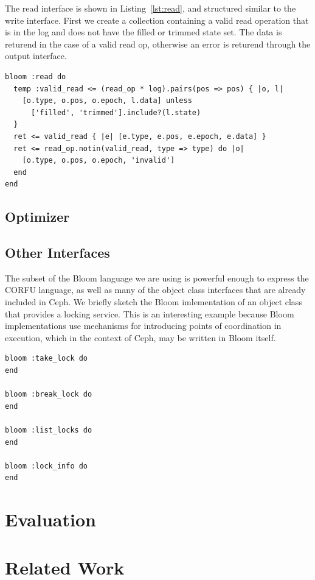 \documentclass[10pt,twocolumn]{article}
\begin{document}
The read interface is shown in Listing~\ref{lst:read}, and structured similar
to the write interface. First we create a collection containing a valid read
operation that is in the log and does not have the filled or trimmed state set.
The data is returend in the case of a valid read op, otherwise an error is
returend through the output interface.

\begin{lstlisting}[caption={Read}, label=lst:read]
bloom :read do
  temp :valid_read <= (read_op * log).pairs(pos => pos) { |o, l|
    [o.type, o.pos, o.epoch, l.data] unless
      ['filled', 'trimmed'].include?(l.state)
  }
  ret <= valid_read { |e| [e.type, e.pos, e.epoch, e.data] }
  ret <= read_op.notin(valid_read, type => type) do |o|
    [o.type, o.pos, o.epoch, 'invalid']
  end
end
\end{lstlisting}

\subsection{Optimizer}

\subsection{Other Interfaces}

The subset of the Bloom language we are using is powerful enough to express the
CORFU language, as well as many of the object class interfaces that are already
included in Ceph. We briefly sketch the Bloom imlementation of an object class
that provides a locking service. This is an interesting example because Bloom
implementations use mechanisms for introducing points of coordination in
execution, which in the context of Ceph, may be written in Bloom itself. 

\begin{lstlisting}[caption={Hello}, label=lab]
bloom :take_lock do
end

bloom :break_lock do
end

bloom :list_locks do
end

bloom :lock_info do
end
\end{lstlisting}

\section{Evaluation}

\section{Related Work}
\end{document}
